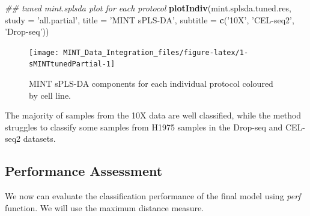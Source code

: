 \documentclass[]{book}
\newenvironment{Shaded}{\begin{snugshade}}{\end{snugshade}}
\newcommand{\CommentTok}[1]{\textcolor[rgb]{0.56,0.35,0.01}{\textit{#1}}}
\newcommand{\DataTypeTok}[1]{\textcolor[rgb]{0.13,0.29,0.53}{#1}}
\newcommand{\DecValTok}[1]{\textcolor[rgb]{0.00,0.00,0.81}{#1}}
\newcommand{\KeywordTok}[1]{\textcolor[rgb]{0.13,0.29,0.53}{\textbf{#1}}}
\newcommand{\NormalTok}[1]{#1}
\newcommand{\OperatorTok}[1]{\textcolor[rgb]{0.81,0.36,0.00}{\textbf{#1}}}
\newcommand{\OtherTok}[1]{\textcolor[rgb]{0.56,0.35,0.01}{#1}}
\newcommand{\StringTok}[1]{\textcolor[rgb]{0.31,0.60,0.02}{#1}}
\theoremstyle{definition}
\theoremstyle{definition}
\theoremstyle{definition}
\theoremstyle{remark}
\begin{document}
\begin{Shaded}
\begin{Highlighting}[]
\CommentTok{## tuned mint.splsda plot for each protocol}
\KeywordTok{plotIndiv}\NormalTok{(mint.splsda.tuned.res, }\DataTypeTok{study =} \StringTok{'all.partial'}\NormalTok{,  }\DataTypeTok{title =} \StringTok{'MINT sPLS-DA'}\NormalTok{, }
          \DataTypeTok{subtitle =} \KeywordTok{c}\NormalTok{(}\StringTok{'10X'}\NormalTok{, }\StringTok{'CEL-seq2'}\NormalTok{, }\StringTok{'Drop-seq'}\NormalTok{))}
\end{Highlighting}
\end{Shaded}

\begin{figure}[ht]

{\centering \texttt{[image: MINT\_Data\_Integration\_files/figure-latex/1-sMINTtunedPartial-1]} 

}

\caption{MINT sPLS-DA components for each individual protocol coloured by cell line.}\label{fig:1-sMINTtunedPartial}
\end{figure}

The majority of samples from the 10X data are well classified, while the
method struggles to classify some samples from H1975 samples in the
Drop-seq and CEL-seq2 datasets.

\hypertarget{performance-assessment}{%
\subsection{Performance Assessment}\label{performance-assessment}}

We now can evaluate the classification performance of the final model
using \emph{perf} function. We will use the maximum distance measure.

\begin{Shaded}
\end{Shaded}
\end{document}
